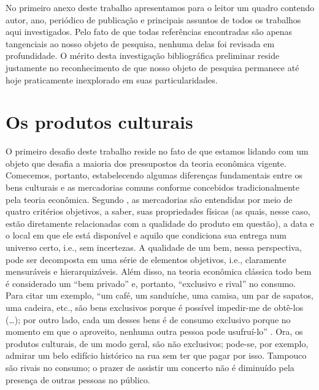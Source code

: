 \documentclass[a4paper, 12pt, openright, oneside, german, french, english, brazil]{abntex2}
\begin{document}
		No primeiro anexo deste trabalho apresentamos para o leitor um quadro contendo autor, ano, periódico de publicação e principais assuntos de todos os trabalhos aqui investigados. Pelo fato de que todas referências encontradas são apenas tangenciais ao nosso objeto de pesquisa, nenhuma delas foi revisada em profundidade. O mérito desta investigação bibliográfica preliminar reside justamente no reconhecimento de que nosso objeto de pesquisa permanece até hoje praticamente inexplorado em suas particularidades.





	\chapter{Os produtos culturais}

	O primeiro desafio deste trabalho reside no fato de que estamos lidando com um objeto que desafia a maioria dos pressupostos da teoria econômica vigente. Comecemos, portanto, estabelecendo algumas diferenças fundamentais entre os bens culturais e as mercadorias comuns conforme concebidos tradicionalmente pela teoria econômica. Segundo , as mercadorias são entendidas por meio de quatro critérios objetivos, a saber, suas propriedades físicas (as quais, nesse caso, estão diretamente relacionadas com a qualidade do produto em questão), a data e o local em que ele está disponível e aquilo que condiciona sua entrega num universo certo, i.e., sem incertezas. A qualidade de um bem, nessa perspectiva, pode ser decomposta em uma série de elementos objetivos, i.e., claramente mensuráveis e hierarquizáveis. Além disso, na teoria econômica clássica todo bem é considerado um ``bem privado'' e, portanto, ``exclusivo e rival'' no consumo. Para citar um exemplo, ``um café, um sanduíche, uma camisa, um par de sapatos, uma cadeira, etc., são bens exclusivos porque é possível impedir-me de obtê-los (\ldots); por outro lado, cada um desses bens é de consumo exclusivo porque no momento em que o aproveito, nenhuma outra pessoa pode usufruí-lo'' \cite[p. 29]{tolila2007cultura}. Ora, os produtos culturais, de um modo geral, são não exclusivos; pode-se, por exemplo, admirar um belo edifício histórico na rua sem ter que pagar por isso. Tampouco são rivais no consumo; o prazer de assistir um concerto não é diminuído pela presença de outras pessoas no público.
\end{document}
